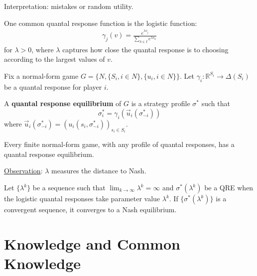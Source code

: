 \documentclass[11pt]{elegantbook}
\begin{document}
Interpretation: mistakes or random utility.

One common quantal response function is the logistic function:
\begin{equation}
    \begin{aligned}
        \gamma_j(v)=\frac{e^{\lambda v_j}}{\sum_{h\in I} e^{\lambda v_h}}
    \end{aligned}
    \nonumber
\end{equation}
for $\lambda>0$, where $\lambda$ captures how close the quantal response is to choosing according to the largest values of $v$.

Fix a normal-form game $G=\{N,\{S_i,i\in N\},\{u_i,i\in N\}\}$. Let $\gamma_i: \mathbb{R}^{S_i} \rightarrow \Delta(S_i)$ be a quantal response for player $i$.
\begin{definition}
    \normalfont
    A \textbf{quantal response equilibrium} of $G$ is a strategy profile $\sigma^*$ such that $$\sigma^*_i=\gamma_i\left(\vec{u}_i(\sigma^*_{-i})\right)$$
    where $\vec{u}_i(\sigma^*_{-i})=(u_i(s_i,\sigma^*_{-i}))_{s_i\in S_{i}}$.
\end{definition}

\begin{proposition}
    Every finite normal-form game, with any profile of quantal responses, has a quantal response equilibrium.
\end{proposition}


\underline{Observation}: $\lambda$ measures the distance to Nash.
\begin{proposition}
    Let $\{\lambda^k\}$ be a sequence such that $\lim_{k \rightarrow \infty}\lambda^k=\infty$ and $\sigma^*(\lambda^k)$ be a QRE when the logistic quantal responses take parameter value $\lambda^k$. If $\{\sigma^*(\lambda^k)\}$ is a convergent sequence, it converges to a Nash equilibrium.
\end{proposition}

\section{Knowledge and Common Knowledge}
\end{document}
